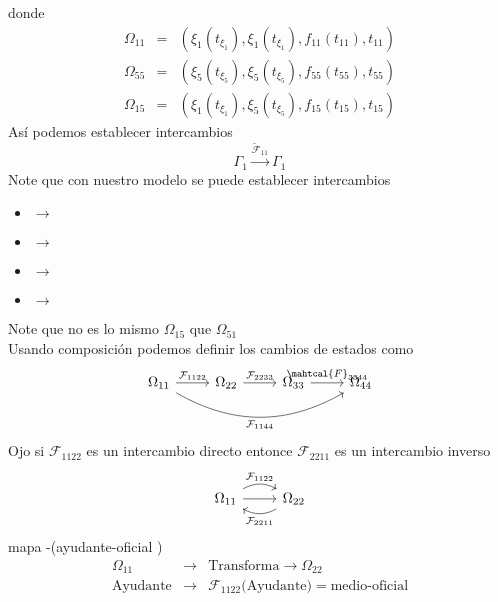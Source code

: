 \documentclass[]{article}
\begin{document}
donde 
\begin{eqnarray}
	\Omega_{11}&=& \left(  \xi_1(t_{\xi_1}), \xi_1(t_{\xi_1}), f_{11}( t_{11}), t_{11} \right)\\
	\Omega_{55}&=& \left(  \xi_5(t_{\xi_5}), \xi_5(t_{\xi_5}), f_{55}(t_{55}), t_{55} \right)\\
	\Omega_{15}&=& \left(  \xi_1(t_{\xi_1}), \xi_5(t_{\xi_5}), f_{15}(t_{15}), t_{15} \right)
\end{eqnarray}
As\'i podemos establecer intercambios 
\begin{equation}
	\Gamma_1 \xrightarrow{{\mathcal{\tilde{F}}_{11}}}\Gamma_1
\end{equation}
Note que con nuestro modelo se puede establecer intercambios

\begin{itemize}[label=$\mapsto$]
\item {} $\longrightarrow$  \\
\item  {} $\longrightarrow$ \\
\item  {} $\longrightarrow$  \\
\item  {}$\longrightarrow$ 
\end{itemize}
Note que no es lo mismo $\Omega_{15}$ que $\Omega_{51}$ \\
Usando composici\'on podemos definir los cambios de estados como
\begin{equation}
	\begin{tikzcd}
		\Omega_{11}\arrow[bend right]{rrr}[swap]{\mathcal{F}_{1144}}\arrow{r}{\mathcal{F}_{1122}}&\Omega_{22}\arrow{r}{\mathcal{F}_{2233}}&\Omega_{33}\arrow{r}{\mahtcal{F}_{3344}}&\Omega_{44}
	\end{tikzcd}
\end{equation}
Ojo si $\mathcal{F}_{1122}$ es un intercambio directo entonce $\mathcal{F}_{2211}$ es un intercambio inverso
\begin{equation}
	\begin{tikzcd}
	\Omega_{11}\arrow[bend left]{r}{\mathcal{F}_{1122}}\arrow{r}&\Omega_{22}\arrow[bend left]{l}{\mathcal{F}_{2211}}
	\end{tikzcd}
\end{equation} 
mapa -(ayudante-oficial )
\begin{eqnarray*}
	\Omega_{11}&\longrightarrow&\text{Transforma}\longrightarrow\Omega_{22}\\
	\text{Ayudante}&\longrightarrow&\mathcal{F}_{1122}\text{(Ayudante)}=\text{medio-oficial}
\end{eqnarray*}
\end{document}
